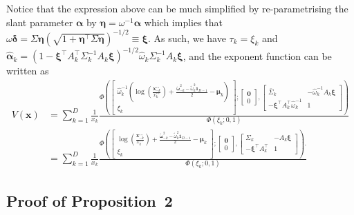 \documentclass[12pt]{article}
\begin{document}
Notice that the expression above can be much simplified by re-parametrising the slant parameter $\bm \alpha$ by $\bm \eta = \omega^{-1}\bm\alpha$ which implies that $\omega \bm \delta = \Sigma\bm\eta\left(\sqrt{1+\bm\eta^\top\Sigma\bm\eta}\right)^{-1/2} \equiv \bm\xi$. As such, we have $\tau_k = \xi_k$ and $\hat{\bm\alpha}_k = \left(1-\bm\xi^\top A_k^\top\Sigma_k^{-1} A_k \bm\xi \right)^{-1/2} \hat{ \omega}_k\Sigma_k^{-1}A_k \bm\xi$, and the exponent function can be written as
%
\begin{align*}
V(\bm x) &= \sum_{k=1}^D \frac{1}{x_k} 
\frac{\Phi \left(
    \begin{bmatrix} 
        \hat{\omega}_k^{-1}\left( \log \left( \frac{\bm x^{\circ\circ}_{-k}}{x^{\circ\circ}_k} \right) + \frac{\tilde{\bm \omega}_{-k}^2 - \tilde{\omega}_k^2\bm 1_{D-1}}{2} - \bm \mu_k\right)  \\
        \xi_k
    \end{bmatrix};
    \begin{bmatrix} 
    \bm 0 \\ 0
    \end{bmatrix},
    \begin{bmatrix}
        \bar\Sigma_k & - \hat{\omega}_k^{-1} A_k \bm \xi  \\
       - \bm \xi^\top A_k^\top \hat{\omega}_k^{-1} &	1
    \end{bmatrix} \right)
    }
    {\Phi\left(\xi_k; 0, 1\right)} \\
 &= \sum_{k=1}^D \frac{1}{x_k} 
\frac{\Phi \left(
    \begin{bmatrix} 
        \log \left( \frac{\bm x^{\circ\circ}_{-k}}{x^{\circ\circ}_k} \right) + \frac{\tilde{\bm \omega}_{-k}^2 - \tilde{\omega}_k^2\bm 1_{D-1}}{2} - \bm \mu_k  \\
        \xi_k
    \end{bmatrix};
    \begin{bmatrix} 
    \bm 0 \\ 0
    \end{bmatrix},
    \begin{bmatrix}
        \Sigma_k & - A_k \bm \xi  \\
       - \bm \xi^\top A_k^\top &	1
    \end{bmatrix} \right).
    }
    {\Phi\left(\xi_k; 0, 1\right)}   
\end{align*}
%


\subsection{Proof of Proposition~2}
\end{document}
